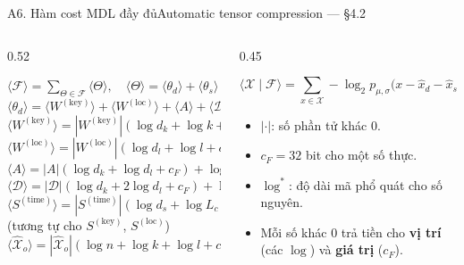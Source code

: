 \begin{frame}{A6. Hàm cost MDL đầy đủ}{Automatic tensor compression --- §4.2}
\begin{columns}[T,onlytextwidth]
\begin{column}{0.52\textwidth}
\begin{mathcard}
  \scriptsize
  $\langle\mathcal F\rangle=\sum_{\Theta\in\mathcal F}\langle\Theta\rangle,\quad
  \langle\Theta\rangle=\langle\theta_d\rangle+\langle\theta_s\rangle+\langle\widehat{\mathcal X}_o\rangle$\\[1mm]
  $\langle\theta_d\rangle=\langle W^{(\mathrm{key})}\rangle+\langle W^{(\mathrm{loc})}\rangle+\langle A\rangle+\langle\mathcal D\rangle$\\[1mm]
  $\langle W^{(\mathrm{key})}\rangle=|W^{(\mathrm{key})}|(\log d_k+\log k+c_F)+\log^*|W^{(\mathrm{key})}|$\\[0.5mm]
  $\langle W^{(\mathrm{loc})}\rangle=|W^{(\mathrm{loc})}|(\log d_l+\log l+c_F)+\log^*|W^{(\mathrm{loc})}|$\\[0.5mm]
  $\langle A\rangle=|A|(\log d_k+\log d_l+c_F)+\log^*|A|$\\[0.5mm]
  $\langle\mathcal D\rangle=|\mathcal D|(\log d_k+2\log d_l+c_F)+\log^*|\mathcal D|$\\[0.5mm]
  $\langle S^{(\mathrm{time})}\rangle=|S^{(\mathrm{time})}|(\log d_s+\log L_c+c_F)+\log^*|S^{(\mathrm{time})}|$\\[0.5mm]
  {\color{DTMuted}(tương tự cho $S^{(\mathrm{key})}$, $S^{(\mathrm{loc})}$)}\\[0.5mm]
  $\langle\widehat{\mathcal X}_o\rangle=|\widehat{\mathcal X}_o|(\log n+\log k+\log l+c_F)+\log^*|\widehat{\mathcal X}_o|$
\end{mathcard}
\end{column}
\begin{column}{0.45\textwidth}
\begin{mathcard}
  \small
  \[
  \langle\mathcal X\mid\mathcal F\rangle=\sum_{x\in\mathcal X}-\log_2 p_{\mu,\sigma}\big(x-\hat x_d-\hat x_s-\hat x_o\big)
  \]
\end{mathcard}
\vspace{1mm}
\small
\begin{itemize}
  \item $|\cdot|$: số phần tử khác 0.
  \item $c_F=32$ bit cho một số thực.
  \item $\log^*$: độ dài mã phổ quát cho số nguyên.
  \item Mỗi số khác 0 trả tiền cho \textbf{vị trí} (các $\log$) và \textbf{giá trị} ($c_F$).
\end{itemize}
\end{column}
\end{columns}
\vfill
{}
\end{frame}

